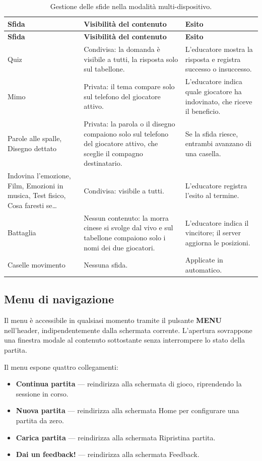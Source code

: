 \documentclass[12pt]{report}
\begin{document}
\begingroup\small
\begin{longtable}{@{}p{3.6cm} p{4.4cm} p{5.0cm}@{}}
\caption{Gestione delle sfide nella modalità multi-dispositivo.}\label{tab:sfide}\\
\hline
\textbf{Sfida} & \textbf{Visibilità del contenuto} & \textbf{Esito} \\ \hline
\endfirsthead
\hline
\textbf{Sfida} & \textbf{Visibilità del contenuto} & \textbf{Esito} \\ \hline
\endhead
Quiz & Condivisa: la domanda è visibile a tutti, la risposta solo sul tabellone. & L'educatore mostra la risposta e registra successo o insuccesso. \\ \hline
Mimo & Privata: il tema compare solo sul telefono del giocatore attivo. & L'educatore indica quale giocatore ha indovinato, che riceve il beneficio. \\ \hline
Parole alle spalle, Disegno dettato & Privata: la parola o il disegno compaiono solo sul telefono del giocatore attivo, che sceglie il compagno destinatario. & Se la sfida riesce, entrambi avanzano di una casella. \\ \hline
Indovina l'emozione, Film, Emozioni in musica, Test fisico, Cosa faresti se\ldots & Condivisa: visibile a tutti. & L'educatore registra l'esito al termine. \\ \hline
Battaglia & Nessun contenuto: la morra cinese si svolge dal vivo e sul tabellone compaiono solo i nomi dei due giocatori. & L'educatore indica il vincitore; il server aggiorna le posizioni. \\ \hline
Caselle movimento & Nessuna sfida. & Applicate in automatico. \\ \hline
\end{longtable}
\endgroup


\subsection{Menu di navigazione}

Il menu è accessibile in qualsiasi momento tramite il pulsante \textbf{MENU} nell'header, indipendentemente dalla schermata corrente.
L'apertura sovrappone una finestra modale al contenuto sottostante senza interrompere lo stato della partita.

Il menu espone quattro collegamenti:
\begin{itemize}
    \item \textbf{Continua partita} --- reindirizza alla schermata di gioco, riprendendo la sessione in corso.
    \item \textbf{Nuova partita} --- reindirizza alla schermata Home per configurare una partita da zero.
    \item \textbf{Carica partita} --- reindirizza alla schermata Ripristina partita.
    \item \textbf{Dai un feedback!} --- reindirizza alla schermata Feedback.
\end{itemize}
\end{document}
